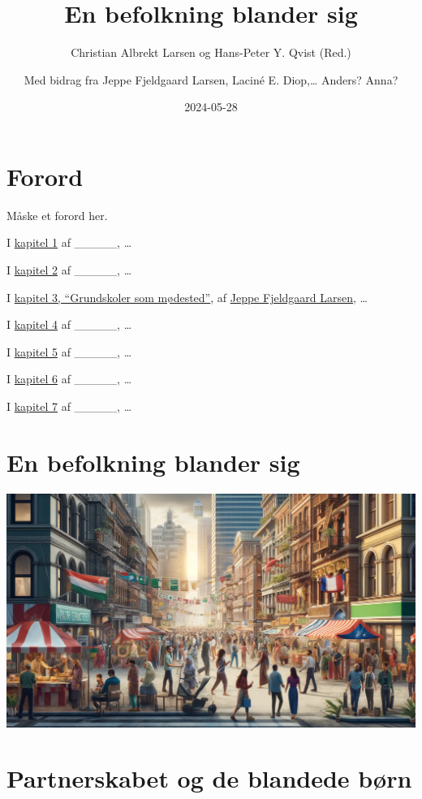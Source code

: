 \documentclass[
]{book}
\title{En befolkning blander sig}
\author{Christian Albrekt Larsen og Hans-Peter Y. Qvist (Red.) \and Med bidrag fra Jeppe Fjeldgaard Larsen, Laciné E. Diop,\ldots{} Anders? Anna?}
\date{2024-05-28}
\begin{document}
\maketitle

{
\setcounter{tocdepth}{1}
\tableofcontents
}
\chapter*{Forord}\label{forord}

Måske et forord her.

I \hyperref[kap1]{kapitel 1} af \_\_\_\_\_, \ldots{}

I \hyperref[kap2]{kapitel 2} af \_\_\_\_\_, \ldots{}

I \hyperref[kap3]{kapitel 3, ``Grundskoler som mødested''}, af \href{https://vbn.aau.dk/da/persons/140717}{Jeppe Fjeldgaard Larsen}, \ldots{}

I \hyperref[kap4]{kapitel 4} af \_\_\_\_\_, \ldots{}

I \hyperref[kap5]{kapitel 5} af \_\_\_\_\_, \ldots{}

I \hyperref[kap6]{kapitel 6} af \_\_\_\_\_, \ldots{}

I \hyperref[kap7]{kapitel 7} af \_\_\_\_\_, \ldots{}

\chapter{En befolkning blander sig}\label{kap1}

\includegraphics[width=1\linewidth]{images/dalle-smeltedige}

\chapter{Partnerskabet og de blandede børn}\label{kap2}
\end{document}
